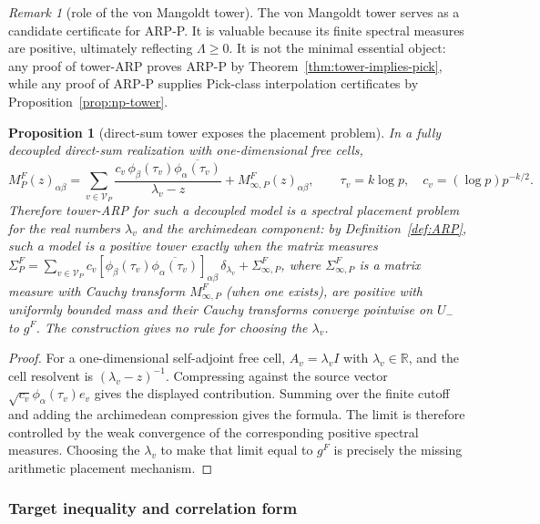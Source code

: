 \documentclass[11pt]{amsart}
\newtheorem{proposition}[theorem]{Proposition}
\theoremstyle{definition}
\theoremstyle{remark}
\newtheorem{remark}[theorem]{Remark}
\theoremstyle{definition}
\newcommand{\R}{\mathbb{R}}
\begin{document}
\begin{remark}[role of the von Mangoldt tower]\label{rmk:vm-tower-role}
The von Mangoldt tower serves as a candidate certificate for ARP-P.  It is valuable because its
finite spectral measures are positive, ultimately reflecting $\Lambda\ge0$.  It is not the minimal
essential object: any proof of tower-ARP proves ARP-P by Theorem~\ref{thm:tower-implies-pick}, while
any proof of ARP-P supplies Pick-class interpolation certificates by Proposition~\ref{prop:np-tower}.
\end{remark}

\begin{proposition}[direct-sum tower exposes the placement problem]\label{prop:placement-problem}
In a fully decoupled direct-sum realization with one-dimensional free cells,
\[
   M_P^F(z)_{\alpha\beta}
   =
   \sum_{v\in\mathcal V_P}
   \frac{c_v\,\phi_\beta(\tau_v)\overline{\phi_\alpha(\tau_v)}}{\lambda_v-z}
   +M_{\infty,P}^F(z)_{\alpha\beta},
   \qquad
   \tau_v=k\log p,\quad c_v=(\log p)p^{-k/2}.
\]
Therefore tower-ARP for such a decoupled model is a spectral placement problem for the real numbers
$\lambda_v$ and the archimedean component: by Definition~\ref{def:ARP}, such a model is a positive
tower exactly when the matrix measures $\Sigma_P^F=\sum_{v\in\mathcal V_P}c_v[\phi_\beta(\tau_v)
\overline{\phi_\alpha(\tau_v)}]_{\alpha\beta}\,\delta_{\lambda_v}+\Sigma_{\infty,P}^F$, where $\Sigma_{\infty,P}^F$ is a matrix measure with
Cauchy transform $M_{\infty,P}^F$ (when one exists), are positive with uniformly bounded mass and their Cauchy transforms converge pointwise on $U_-$ to $g^F$.
The construction gives no rule for choosing the $\lambda_v$.
\end{proposition}

\begin{proof}
For a one-dimensional self-adjoint free cell, $A_v=\lambda_v I$ with $\lambda_v\in\R$, and the cell
resolvent is $(\lambda_v-z)^{-1}$.  Compressing against the source vector
$\sqrt{c_v}\phi_\alpha(\tau_v)e_v$ gives the displayed contribution.  Summing over the finite
cutoff and adding the archimedean compression gives the formula.  The limit is therefore controlled by
the weak convergence of the corresponding positive spectral measures.  Choosing the $\lambda_v$ to make
that limit equal to $g^F$ is precisely the missing arithmetic placement mechanism.
\end{proof}

\subsubsection{Target inequality and correlation form}
\end{document}
